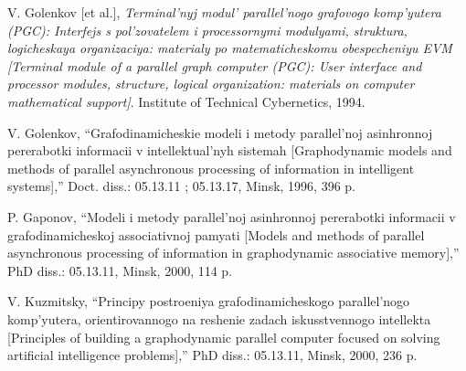 \documentclass{article}
\begin{document}
{\begin{multicols}{2}
{\begin{thebibliography}{65}
    \item V. Golenkov [et al.], \textit{Terminal’nyj modul’ parallel’nogo grafovogo
komp’yutera (PGC): Interfejs s pol’zovatelem i processornymi
modulyami, struktura, logicheskaya organizaciya: materialy po
matematicheskomu obespecheniyu EVM [Terminal module of a
parallel graph computer (PGC): User interface and processor
modules, structure, logical organization: materials on computer
mathematical support]}. Institute of Technical Cybernetics, 1994.
    \item V. Golenkov, “Grafodinamicheskie modeli i metody parallel’noj
asinhronnoj pererabotki informacii v intellektual’nyh sistemah
[Graphodynamic models and methods of parallel asynchronous
processing of information in intelligent systems],” Doct. diss.:
05.13.11 ; 05.13.17, Minsk, 1996, 396 p.
    \item P. Gaponov, “Modeli i metody parallel’noj asinhronnoj pererabotki
informacii v grafodinamicheskoj associativnoj pamyati [Models
and methods of parallel asynchronous processing of information in
graphodynamic associative memory],” PhD diss.: 05.13.11, Minsk,
2000, 114 p.

    \item V. Kuzmitsky, “Principy postroeniya grafodinamicheskogo
parallel’nogo komp’yutera, orientirovannogo na reshenie zadach
iskusstvennogo intellekta [Principles of building a graphodynamic
parallel computer focused on solving artificial intelligence
problems],” PhD diss.: 05.13.11, Minsk, 2000, 236 p.


\end{thebibliography}
}

\end{multicols}
}
\end{document}
